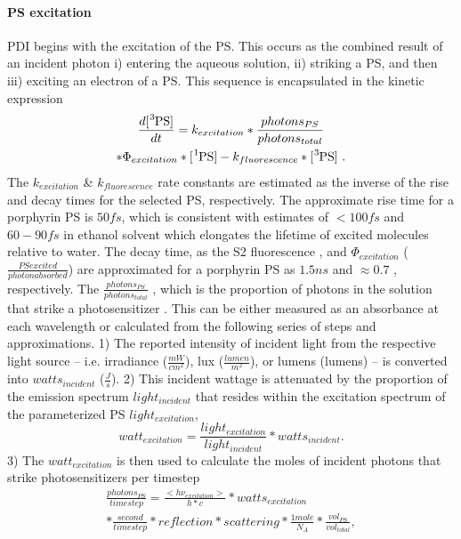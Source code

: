 \paragraph{PS excitation}
PDI begins with the excitation of the PS. This occurs as the combined result of an incident photon i) entering the aqueous solution, ii) striking a PS, and then iii) exciting an electron of a PS. This sequence is encapsulated in the kinetic expression
\begin{multline} \label{ps_excitation_kinetics}
    \frac{d[\ce{^3PS}]}{dt} =  k_{excitation}*\frac{photons_{PS}}{photons_{total}} \\ 
    *\Phi_{excitation}*[\ce{^1PS}] - k_{fluorescence}*[\ce{^3PS}]~. 
\end{multline}
The $k_{excitation}$ \& $k_{fluorescence}$ rate constants are estimated as the inverse of the rise and decay times for the selected PS, respectively. The approximate rise time for a porphyrin PS is $50 fs$, which is consistent with estimates of $<100 fs$ \cite{Andersson1999PhotoinducedState} and $60-90 fs$ in ethanol solvent \cite{Gurzadyan1998Time-resolvedZn-tetraphenylporphyrin} which elongates the lifetime of excited molecules relative to water. The decay time, as the S2 fluorescence \cite{Akimoto1999UltrafastPorphyrins}, and $\Phi_{excitation}$ ($\frac{PS excited}{photon absorbed}$) are approximated for a porphyrin PS as $1.5 ns$ and $\approx 0.7$ \cite{Krasnovsky2012PhotochemicalEnvironment}, respectively. The $\frac{photons_{PS}}{photons_{total}}$ \cite{Brasel2020AnAgalactiae}, which is the proportion of photons in the solution that strike a photosensitizer \cite{Santos2020ApplicationAureus}. This can be either measured as an absorbance at each wavelength \cite{Gerola2012ChemicalPhotobleaching} or calculated from the following series of steps and approximations. 1) The reported intensity of incident light from the respective light source -- i.e. irradiance ($\frac{mW}{cm^2}$), lux ($\frac{lumen}{m^2}$), or lumens (lumens) -- is converted into $watts_{incident}$ ($\frac{J}{s}$). 2) This incident wattage is attenuated by the proportion of the emission spectrum $light_{incident}$ that resides within the excitation spectrum of the parameterized PS $light_{excitation}$, 
\begin{equation}
    watt_{excitation} = \frac{light_{excitation}}{light_{incident}}*watts_{incident}.
\end{equation}
3) The $watt_{excitation}$ is then used to calculate the moles of incident photons that strike photosensitizers per timestep 
\begin{multline} \label{photons_per_second}
    \frac{photons_{PS}}{timestep}=\frac{<h\nu_{excitation}>}{h*c}*watts_{excitation} \\
    *\frac{second}{timestep}*reflection*scattering*\frac{1 mole}{N_A}*\frac{vol_{PS}}{vol_{total}},
\end{multline}

